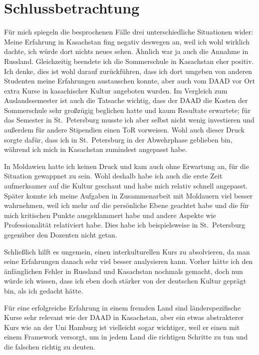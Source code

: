 \documentclass[12pt,headsepline,a4paper]{scrartcl}
\begin{document}
\section*{Schlussbetrachtung}

Für mich spiegeln die besprochenen Fälle drei unterschiedliche Situationen wider: Meine Erfahrung in Kasachstan fing negativ deswegen an, weil ich wohl wirklich dachte, ich würde dort nichts neues sehen. Ähnlich war ja auch die Annahme in Russland. Gleichzeitig beendete ich die Sommerschule in Kasachstan eher positiv. Ich denke, dies ist wohl darauf zurückführen, dass ich dort umgeben von anderen Studenten meine Erfahrungen austauschen konnte, aber auch vom DAAD vor Ort extra Kurse in kasachischer Kultur angeboten wurden. Im Vergleich zum Auslandssemester ist auch die Tatsache wichtig, dass der DAAD die Kosten der Sommerschule sehr großzügig beglichen hatte und kaum Resultate erwartete; für das Semester in St.\ Petersburg musste ich aber selbst nicht wenig investieren und außerdem für andere Stipendien einen ToR vorweisen. Wohl auch dieser Druck sorgte dafür, dass ich in St.\ Petersburg in der Abwehrphase geblieben bin, während ich mich in Kasachstan zumindest angepasst habe.

In Moldawien hatte ich keinen Druck und kam auch ohne Erwartung an, für die Situation gewappnet zu sein. Wohl deshalb habe ich auch die erste Zeit aufmerksamer auf die Kultur geschaut und habe mich relativ schnell angepasst. Später konnte ich meine Aufgaben in Zusammenarbeit mit Moldauern viel besser wahrnehmen, weil ich mehr auf die persönliche Ebene geachtet habe und die für mich kritischen Punkte ausgeklammert habe und andere Aspekte wie Professionalität relativiert habe. Dies habe ich beispielsweise in St.\ Petersburg gegenüber den Dozenten nicht getan.

Schließlich hilft es ungemein, einen interkulturellen Kurs zu absolvieren, da man seine Erfahrungen danach sehr viel besser analysieren kann. Vorher hätte ich den änfänglichen Fehler in Russland und Kasachstan nochmals gemacht, doch nun würde ich wissen, dass ich eben doch stärker von der deutschen Kultur geprägt bin, als ich gedacht hätte. 

Für eine erfolgreiche Erfahrung in einem fremden Land sind länderspezifische Kurse sehr relevant wie der DAAD in Kasachstan, aber ein etwas abstrakterer Kurs wie an der Uni Hamburg ist vielleicht sogar wichtiger, weil er einen mit einem Framework versorgt, um in jedem Land die richtigen Schritte zu tun und die falschen richtig zu deuten.
\end{document}
